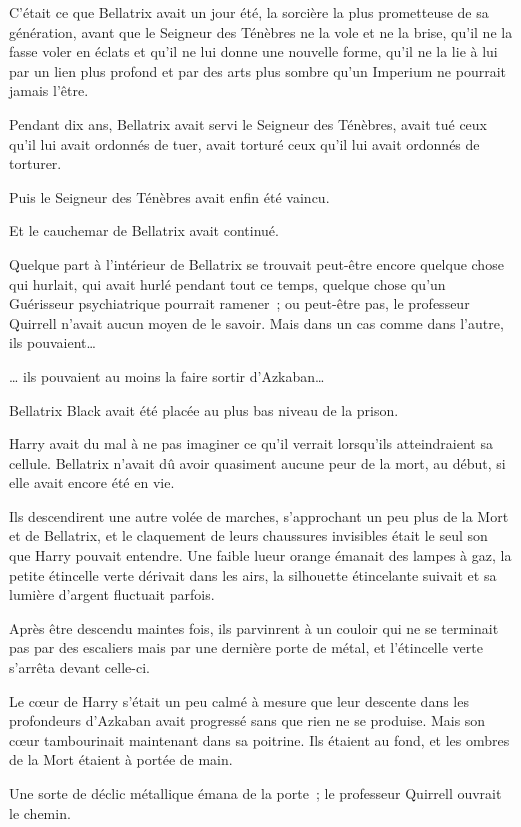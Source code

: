 C'était ce que Bellatrix avait un jour été, la sorcière la plus prometteuse de sa génération, avant que le Seigneur des Ténèbres ne la vole et ne la brise, qu'il ne la fasse voler en éclats et qu'il ne lui donne une nouvelle forme, qu'il ne la lie à lui par un lien plus profond et par des arts plus sombre qu'un Imperium ne pourrait jamais l'être.

Pendant dix ans, Bellatrix avait servi le Seigneur des Ténèbres, avait tué ceux qu'il lui avait ordonnés de tuer, avait torturé ceux qu'il lui avait ordonnés de torturer.

Puis le Seigneur des Ténèbres avait enfin été vaincu.

Et le cauchemar de Bellatrix avait continué.

Quelque part à l'intérieur de Bellatrix se trouvait peut-être encore quelque chose qui hurlait, qui avait hurlé pendant tout ce temps, quelque chose qu'un Guérisseur psychiatrique pourrait ramener~; ou peut-être pas, le professeur Quirrell n'avait aucun moyen de le savoir. Mais dans un cas comme dans l'autre, ils pouvaient…

… ils pouvaient au moins la faire sortir d'Azkaban…

Bellatrix Black avait été placée au plus bas niveau de la prison.

Harry avait du mal à ne pas imaginer ce qu'il verrait lorsqu'ils atteindraient sa cellule. Bellatrix n'avait dû avoir quasiment aucune peur de la mort, au début, si elle avait encore été en vie.

Ils descendirent une autre volée de marches, s'approchant un peu plus de la Mort et de Bellatrix, et le claquement de leurs chaussures invisibles était le seul son que Harry pouvait entendre. Une faible lueur orange émanait des lampes à gaz, la petite étincelle verte dérivait dans les airs, la silhouette étincelante suivait et sa lumière d'argent fluctuait parfois.

\later

Après être descendu maintes fois, ils parvinrent à un couloir qui ne se terminait pas par des escaliers mais par une dernière porte de métal, et l'étincelle verte s'arrêta devant celle-ci.

Le cœur de Harry s'était un peu calmé à mesure que leur descente dans les profondeurs d'Azkaban avait progressé sans que rien ne se produise. Mais son cœur tambourinait maintenant dans sa poitrine. Ils étaient au fond, et les ombres de la Mort étaient à portée de main.

Une sorte de déclic métallique émana de la porte~; le professeur Quirrell ouvrait le chemin.

